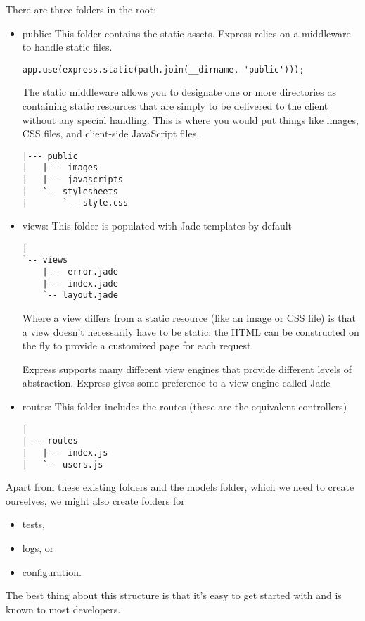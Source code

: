 There are three folders in the root:
\begin{itemize}
\item public: This folder contains the static assets.
Express relies on a middleware to handle static files.
\begin{verbatim}
app.use(express.static(path.join(__dirname, 'public')));
\end{verbatim}
The static middleware allows you to designate one or more directories
as containing static resources that are simply to be delivered to the
client without any special handling. This is where you would put things
like images, CSS files, and client-side JavaScript files.
\begin{verbatim}
|--- public
|   |--- images
|   |--- javascripts
|   `-- stylesheets
|       `-- style.css
\end{verbatim}
\item views: This folder is populated with Jade templates by default
\begin{verbatim}
| 
`-- views
    |--- error.jade
    |--- index.jade
    `-- layout.jade
\end{verbatim}
Where a view differs from a static resource (like an image or CSS file)
is that a view doesn’t necessarily have to be static: the HTML can be
constructed on the fly to provide a customized page for each request.

Express supports many different view engines that provide different levels of abstraction. 
Express gives some preference to a view engine called Jade 
\item routes: This folder includes the routes (these are the equivalent controllers)
\begin{verbatim}
|
|--- routes
|   |--- index.js
|   `-- users.js
\end{verbatim}
\end{itemize}
Apart from these existing folders and the models folder, which we need to create ourselves, we might also create folders for 
\begin{itemize}
\item
tests, 
\item
logs, or 
\item
configuration. 
\end{itemize}

The best thing about this structure is that
it's easy to get started with and is known to most developers.



